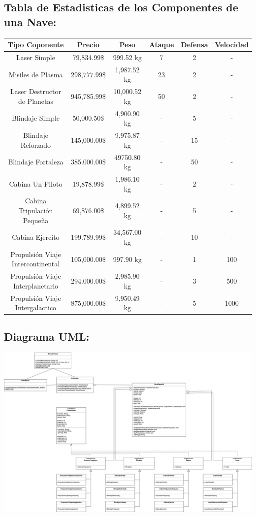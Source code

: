 \documentclass{article}
\begin{document}
\subsection*{Tabla de Estadisticas de los Componentes de una Nave:}
\begin{table}[h!]
	\centering
	\begin{tabular}{|c|c|c|c|c|c|}
		\hline
		Tipo Coponente & Precio & Peso & Ataque & Defensa & Velocidad \\ \hline
		Laser Simple & 79,834.99\$ & 999.52 kg & 7 & 2 & - \\
		Misiles de Plasma & 298,777.99\$ & 1,987.52 kg & 23 & 2 & - \\
		Laser Destructor de Planetas & 945,785.99\$ & 10,000.52 kg & 50 & 2 & - \\
		Blindaje Simple & 50,000.50\$ & 4,900.90 kg & - & 5 & - \\
		Blindaje Reforzado & 145,000.00\$ & 9,975.87 kg & - & 15 & - \\
		Blindaje Fortaleza & 385.000.00\$ & 49750.80 kg & - & 50 & - \\
		Cabina Un Piloto & 19,878.99\$ & 1,986.10 kg & - & 2 & - \\
		Cabina Tripulación Pequeña & 69,876.00\$ & 4,899.52 kg & - & 5 & - \\
		Cabina Ejercito & 199.789.99\$ & 34,567.00 kg & - & 10 & - \\
		Propulsión Viaje Intercontinental & 105,000.00\$ & 997.90 kg & - & 1 & 100 \\
		Propulsión Viaje Interplanetario & 294.000.00\$ & 2,985.90 kg & - & 3 & 500 \\
		Propulsión Viaje Intergalactico & 875,000.00\$ & 9,950.49 kg & - & 5 & 1000 \\ \hline
	\end{tabular}
\end{table}

\newpage
\subsection*{Diagrama UML:}
\begin{center}
  \includegraphics[scale=0.18]{./Practica04UML.png}
\end{center}
\end{document}
